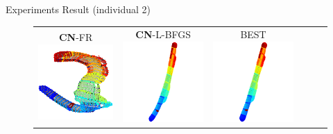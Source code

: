 \documentclass[dvipdfmx,13pt,aspectratio=169]{beamer}
\begin{document}
\begin{frame}{Experiments Result (individual 2)}
\begin{figure}[h]
\begin{tabular}{cccccc}
        \makecell{\small{\textsf{\textbf{CN}-FR}}                                                                                                            \\[-0.2em]\includegraphics[width=0.135\columnwidth]{../main/individual/vis/dwt_2680_CN-FR.png}} &
        \makecell{\small{\textsf{\textbf{CN}-L-BFGS}}                                                                                                        \\[-0.2em]\includegraphics[width=0.135\columnwidth]{../main/individual/vis/dwt_2680_CN-L-BFGS.png}} &
        \makecell{\small{\textsf{BEST}}                                                                                                                      \\[-0.2em]\includegraphics[width=0.135\columnwidth]{../main/individual/vis/opt_dwt_2680.png}} \\


\end{tabular}
\end{figure}
\end{frame}
\end{document}
